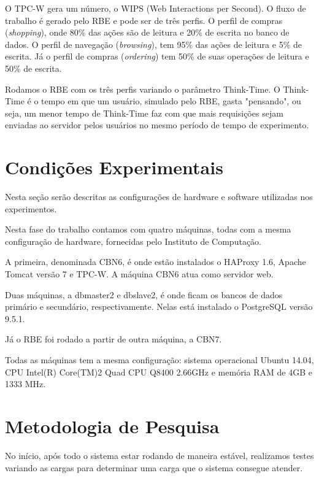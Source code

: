 \documentclass[11pt,twoside]{article}
\begin{document}
    O TPC-W gera um n\'umero, o WIPS (Web Interactions per Second). O fluxo de trabalho é gerado pelo RBE e pode ser de tr\^es perfis. O perfil de compras (\textit{shopping}), onde 80\% das a\c{c}\~oes são de leitura e 20\% de escrita no banco de dados. O perfil de navega\c{c}\~ao (\textit{browsing}), tem 95\% das a\c{c}\~oes de leitura e 5\% de escrita. J\'a o perfil de compras (\textit{ordering}) tem 50\% de suas opera\c{c}\~oes de leitura e 50\% de escrita.

    Rodamos o RBE com os três perfis variando o parâmetro Think-Time. O Think-Time é o tempo em que um usuário, simulado pelo RBE, gasta "pensando", ou seja, um menor tempo de Think-Time faz com que mais requisições sejam enviadas ao servidor pelos usuários no mesmo período de tempo de experimento.

\setlength{\parindent}{4ex}


\section{Condições Experimentais}
\setlength{\parindent}{4ex}
     Nesta se\c{c}\~ao ser\~ao descritas as configura\c{c}\~oes de hardware e software utilizadas nos experimentos.

     Nesta fase do trabalho contamos com quatro máquinas, todas com a mesma configuração de hardware, fornecidas pelo Instituto de Computação.

     A primeira, denominada CBN6, é onde estão instalados o HAProxy 1.6, Apache Tomcat versão 7 e TPC-W. A máquina CBN6 atua como servidor web.

     Duas máquinas, a dbmaster2 e dbslave2, é onde ficam os bancos de dados primário e secundário, respectivamente. Nelas está instalado o PostgreSQL vers\~ao 9.5.1.

     Já o RBE foi rodado a partir de outra máquina, a CBN7.

     Todas as máquinas tem a mesma configuração: sistema operacional Ubuntu 14.04, CPU Intel(R) Core(TM)2 Quad CPU Q8400 2.66GHz e mem\'oria RAM de 4GB e 1333 MHz.

\section{Metodologia de Pesquisa}
\setlength{\parindent}{4ex}
No início, após todo o sistema estar rodando de maneira estável, realizamos testes variando as cargas para determinar uma carga que o sistema consegue atender.
\end{document}
